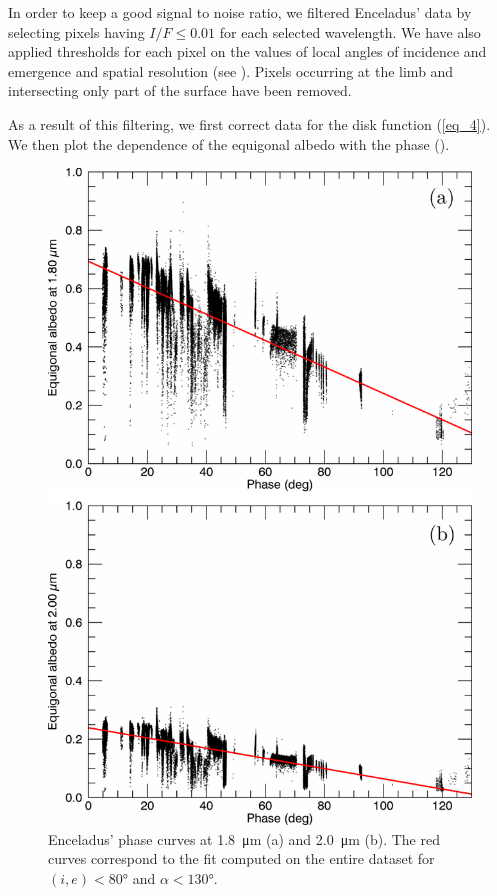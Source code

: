 \documentclass{arxiv-icarus}
\begin{document}
In order to keep a good signal to noise ratio, we filtered Enceladus' data by selecting pixels having $I/F \le 0.01$ for each selected wavelength. We have also applied thresholds for each pixel on the values of local angles of incidence and emergence and spatial resolution (see ). Pixels occurring at the limb and intersecting only part of the surface have been removed.

As a result of this filtering, we first correct data for the disk function (\eqref{eq_4}). We then plot the dependence of the equigonal albedo with the phase ().

\begin{figure}[!ht]
    \includegraphics[width=.9\linewidth]{Fig_4}
    \caption{Enceladus' phase curves at \SI{1.8}{\um} (a) and \SI{2.0}{\um} (b). The red curves correspond to the fit computed on the entire dataset for $(i, e) < \ang{80}$ and $\alpha < \ang{130}$.}
    \label{fig:fig_4}
\end{figure}
\end{document}
